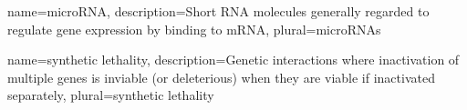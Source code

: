{
  name=microRNA,
  description={Short RNA molecules generally regarded to regulate gene expression by binding to mRNA},
  plural=microRNAs
}

{
  name=synthetic lethality,
  description={Genetic interactions where inactivation of multiple genes is inviable (or deleterious) when they are viable if inactivated separately},
  plural=synthetic lethality
}





















